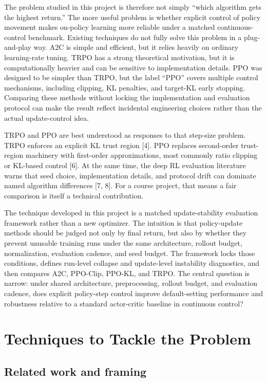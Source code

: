 \documentclass{article}
\begin{document}
The problem studied in this project is therefore not simply ``which algorithm gets the highest return.'' The more useful problem is whether explicit control of policy movement makes on-policy learning more reliable under a matched continuous-control benchmark. Existing techniques do not fully solve this problem in a plug-and-play way. A2C is simple and efficient, but it relies heavily on ordinary learning-rate tuning. TRPO has a strong theoretical motivation, but it is computationally heavier and can be sensitive to implementation details. PPO was designed to be simpler than TRPO, but the label ``PPO'' covers multiple control mechanisms, including clipping, KL penalties, and target-KL early stopping. Comparing these methods without locking the implementation and evaluation protocol can make the result reflect incidental engineering choices rather than the actual update-control idea.

TRPO and PPO are best understood as responses to that step-size problem. TRPO enforces an explicit KL trust region [4]. PPO replaces second-order trust-region machinery with first-order approximations, most commonly ratio clipping or KL-based control [6]. At the same time, the deep RL evaluation literature warns that seed choice, implementation details, and protocol drift can dominate named algorithm differences [7, 8]. For a course project, that means a fair comparison is itself a technical contribution.

The technique developed in this project is a matched update-stability evaluation framework rather than a new optimizer. The intuition is that policy-update methods should be judged not only by final return, but also by whether they prevent unusable training runs under the same architecture, rollout budget, normalization, evaluation cadence, and seed budget. The framework locks those conditions, defines run-level collapse and update-level instability diagnostics, and then compares A2C, PPO-Clip, PPO-KL, and TRPO. The central question is narrow: under shared architecture, preprocessing, rollout budget, and evaluation cadence, does explicit policy-step control improve default-setting performance and robustness relative to a standard actor-critic baseline in continuous control?

\section{Techniques to Tackle the Problem}

\subsection{Related work and framing}
\end{document}
